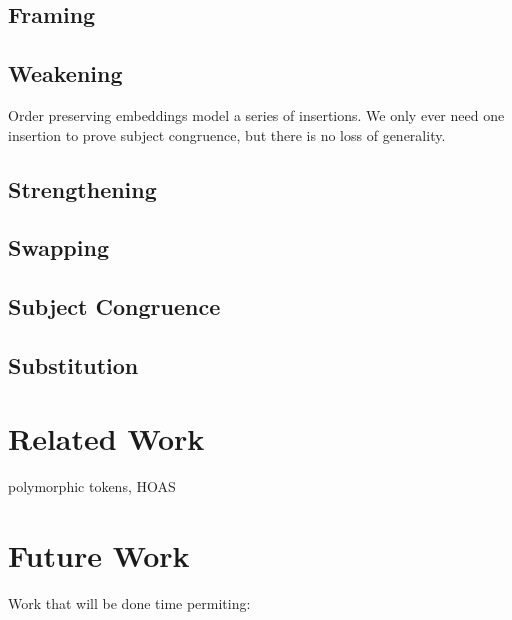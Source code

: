 \documentclass[a4paper,UKenglish,cleveref, autoref, thm-restate,authorcolumns]{lipics-v2019}
\begin{document}
\subsection{Framing}


\subsection{Weakening}

Order preserving embeddings model a series of insertions. We only ever need one insertion to prove subject congruence, but there is no loss of generality.

\subsection{Strengthening}

\subsection{Swapping}

\subsection{Subject Congruence}\label{subject-congruence}

\subsection{Substitution}

\section{Related Work}

\cite{previous-work} polymorphic tokens, HOAS

\cite{typing-with-leftovers}

\cite{Higher-inductive-types-for-congruence}

\cite{LTS-semantics}

\cite{work-on-session-types}


\section{Future Work}

Work that will be done time permiting:
\end{document}
